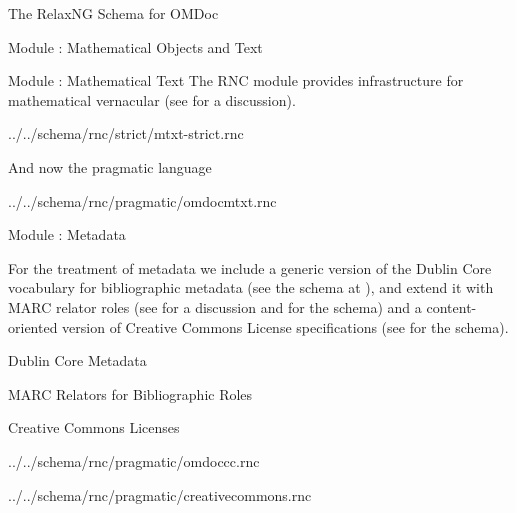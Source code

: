 \begin{omgroup}[id=rnc]{The RelaxNG Schema for OMDoc}
\begin{omgroup}[id=rnc.math]{Module {}: Mathematical Objects and Text}

\end{omgroup}

\begin{omgroup}[id=rnc.mtxt]{Module {}: Mathematical Text}
  The RNC module {} provides infrastructure for mathematical vernacular
  (see {} for a discussion).
  
  {../../schema/rnc/strict/mtxt-strict.rnc}

  And now the pragmatic language
  
                          {../../schema/rnc/pragmatic/omdocmtxt.rnc}
\end{omgroup}

\begin{omgroup}[id=rnc.meta]{Module {}: Metadata}

  For the treatment of metadata we include a generic version of the Dublin Core vocabulary
  for bibliographic metadata (see the schema at {}), and extend it with MARC
  relator roles (see {} for a discussion and
  {} for the schema) and a content-oriented version of Creative Commons
  License specifications (see {} for the schema).


\end{omgroup}

\begin{omgroup}[id=rnc.dc]{Dublin Core Metadata}


\end{omgroup}

\begin{omgroup}[id=rnc.marc]{MARC Relators for Bibliographic Roles}

\end{omgroup}

\begin{omgroup}[id=rnc.cc]{Creative Commons Licenses}

  {../../schema/rnc/pragmatic/omdoccc.rnc}

  {../../schema/rnc/pragmatic/creativecommons.rnc}
\end{omgroup}


\end{omgroup}
